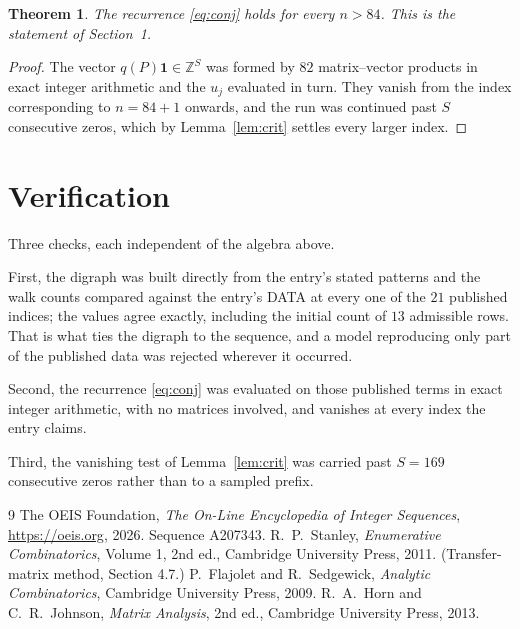 \documentclass[11pt,a4paper]{article}
\theoremstyle{plain}
\newtheorem{theorem}{Theorem}
\theoremstyle{definition}
\begin{document}
\begin{theorem}
The recurrence \eqref{eq:conj} holds for every $n>84$. This is the statement of
Section~1.
\end{theorem}

\begin{proof}
The vector $q(P)\mathbf{1}\in\mathbb{Z}^{S}$ was formed by $82$ matrix--vector
products in exact integer arithmetic and the $u_j$ evaluated in turn. They vanish from the
index corresponding to $n=84+1$ onwards, and the run was continued past $S$ consecutive
zeros, which by Lemma~\ref{lem:crit} settles every larger index.
\end{proof}

\section{Verification}

Three checks, each independent of the algebra above.

First, the digraph was built directly from the entry's stated patterns and the walk counts
compared against the entry's DATA at every one of the $21$ published indices; the
values agree exactly, including the initial count of $13$ admissible rows. That is
what ties the digraph to the sequence, and a model reproducing only part of the published
data was rejected wherever it occurred.

Second, the recurrence \eqref{eq:conj} was evaluated on those published terms in exact
integer arithmetic, with no matrices involved, and vanishes at every index the entry claims.

Third, the vanishing test of Lemma~\ref{lem:crit} was carried past $S=169$ consecutive
zeros rather than to a sampled prefix.

\begin{thebibliography}{9}
 The OEIS Foundation, \emph{The On-Line Encyclopedia of Integer
Sequences}, \url{https://oeis.org}, 2026. Sequence A207343.
 R.~P.~Stanley, \emph{Enumerative Combinatorics}, Volume 1, 2nd ed.,
Cambridge University Press, 2011. (Transfer-matrix method, Section 4.7.)
 P.~Flajolet and R.~Sedgewick, \emph{Analytic Combinatorics}, Cambridge
University Press, 2009.
 R.~A.~Horn and C.~R.~Johnson, \emph{Matrix Analysis}, 2nd ed., Cambridge
University Press, 2013.
\end{thebibliography}
\end{document}
